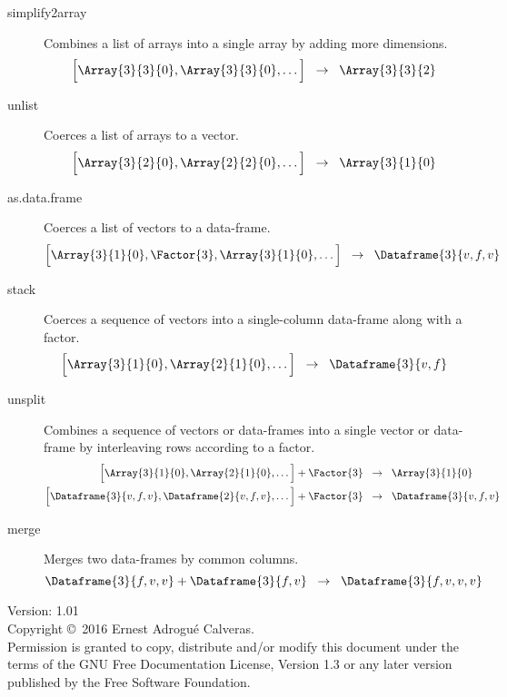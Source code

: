 \documentclass[a4paper,landscape]{article}
\newcommand{\Maps}{\;\;\rightarrow \;\;}
\begin{document}
\begin{multicols*}{3}
\begin{description}
\item[simplify2array] Combines a list of arrays into a single array by
  adding more dimensions.
  \[ \List{\Array{3}{3}{0},\Array{3}{3}{0},\dots} \Maps \Array{3}{3}{2} \]

\item[unlist] Coerces a list of arrays to a vector.
  \[ \List{\Array{3}{2}{0},\Array{2}{2}{0},\dots} \Maps \Array{3}{1}{0} \]

\item[as.data.frame] Coerces a list of vectors to a data-frame.
  \[
  \List{\Array{3}{1}{0},\Factor{3},\Array{3}{1}{0},\dots} \Maps
  \Dataframe{3}{v,f,v}
  \]

\item[stack] Coerces a sequence of vectors into a single-column data-frame
  along with a factor.
  \[ \List{\Array{3}{1}{0},\Array{2}{1}{0},\dots} \Maps \Dataframe{3}{v,f} \]

\item[unsplit] Combines a sequence of vectors or data-frames into a single
  vector or data-frame by interleaving rows according to a factor.
  \begin{align*}
    \List{\Array{3}{1}{0},\Array{2}{1}{0},\dots} + \Factor{3}
    &\Maps \Array{3}{1}{0} \\
    \List{\Dataframe{3}{v,f,v},\Dataframe{2}{v,f,v},\dots} + \Factor{3}
    &\Maps \Dataframe{3}{v,f,v}
  \end{align*}

\item[merge] Merges two data-frames by common columns.
  \[ \Dataframe{3}{f,v,v} + \Dataframe{3}{f,v} \Maps
  \Dataframe{3}{f,v,v,v} \]
\end{description}

\vfill
\vrule width3cm height.5pt

\scriptsize
Version: 1.01 \\
Copyright \copyright\ 2016 Ernest Adrogu\'e Calveras. \\
Permission is granted to copy, distribute and/or modify this document under
the terms of the GNU Free Documentation License, Version 1.3 or any later
version published by the Free Software Foundation.


\end{multicols*}
\end{document}
